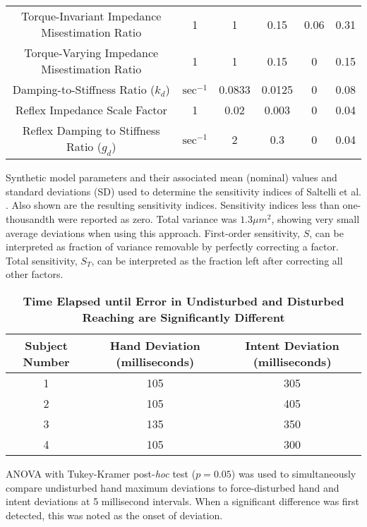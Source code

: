 \documentclass[10pt]{article}
\begin{document}
\begin{table}[!ht]
\begin{tabular}{|c|c|c c|c c|}
Torque-Invariant Impedance Misestimation Ratio &
1 &
1 &
0.15 &
0.06 &
0.31 \\
Torque-Varying Impedance Misestimation Ratio &
1 &
1 &
0.15 &
0 &
0.15 \\
Damping-to-Stiffness Ratio ($k_d$) &
$\text{sec}^{-1}$ &
0.0833 &
0.0125 &
0 &
0.08 \\
Reflex Impedance Scale Factor &
1 &
0.02 &
0.003 &
0 &
0.04 \\
Reflex Damping to Stiffness Ratio ($g_d$) &
$\text{sec}^{-1}$ &
2 &
0.3 &
0 &
0.04 \\ \hline
\end{tabular}
\begin{flushleft}Synthetic model parameters and their associated mean (nominal) values and standard deviations (SD) used to determine the sensitivity indices of Saltelli et al. \cite{saltelli2010variance}. Also shown are the resulting sensitivity indices. Sensitivity indices less than one-thousandth were reported as zero. Total variance was $1.3 \mu m^2$, showing very small average deviations when using this approach. First-order sensitivity, $S$, can be interpreted as fraction of variance removable by perfectly correcting a factor. Total sensitivity, $S_T$, can be interpreted as the fraction left after correcting all other factors.
\end{flushleft}
\label{tab:parameters}
\end{table}

\begin{table}[!ht]
\caption{
\bf{Time Elapsed until Error in Undisturbed and Disturbed Reaching are Significantly Different}}
\begin{tabular}{|c|c|c|}
\hline
Subject Number &
Hand Deviation (milliseconds) &
Intent Deviation (milliseconds) \\ \hline
1 &
105 &
305 \\
2 &
105 &
405 \\
3 &
135 &
350 \\
4 &
105 &
300 \\ \hline
\end{tabular}
\begin{flushleft} ANOVA with Tukey-Kramer post-\textit{hoc} test ($p=0.05$) was used to simultaneously compare undisturbed hand maximum deviations to force-disturbed hand and intent deviations at 5 millisecond intervals. When  a significant difference was first detected, this was noted as the onset of deviation.
\end{flushleft}
\label{tab:onsets}
\end{table}
\end{document}

